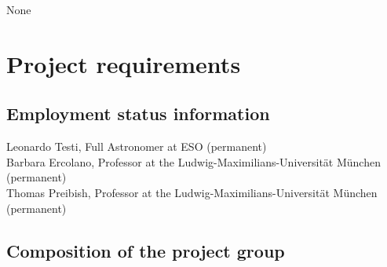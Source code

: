 \documentclass[10pt,fleqn,twoside]{article}
\begin{document}
None

% 
% 
% 
% 
% 
% 
% 

\section{Project requirements}
\renewcommand{\leftmark}{\sc Project requirements}

\subsection{Employment status information}

Leonardo Testi, Full Astronomer at ESO (permanent)\\
Barbara Ercolano, Professor at the Ludwig-Maximilians-Universit\"at
M\"unchen (permanent)\\
Thomas Preibish, Professor at the Ludwig-Maximilians-Universit\"at
M\"unchen (permanent)

%

\subsection{Composition of the project group}
\end{document}
